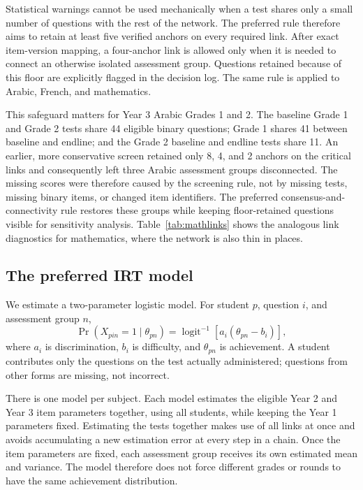 Statistical warnings cannot be used mechanically when a test shares only a
small number of questions with the rest of the network. The preferred rule
therefore aims to retain at least five verified anchors on every required link.
After exact item-version mapping, a four-anchor link is allowed only when it is
needed to connect an otherwise isolated assessment group. Questions retained
because of this floor are explicitly flagged in the decision log. The same
rule is applied to Arabic, French, and mathematics.

This safeguard matters for Year 3 Arabic Grades 1 and 2. The baseline Grade 1
and Grade 2 tests share 44 eligible binary questions; Grade 1 shares 41 between
baseline and endline; and the Grade 2 baseline and endline tests share 11. An
earlier, more conservative screen retained only 8, 4, and 2 anchors on the
critical links and consequently left three Arabic assessment groups
disconnected. The missing scores were therefore caused by the screening rule,
not by missing tests, missing binary items, or changed item identifiers. The
preferred consensus-and-connectivity rule restores these groups while keeping
floor-retained questions visible for sensitivity analysis. Table~\ref{tab:mathlinks}
shows the analogous link diagnostics for mathematics, where the network is
also thin in places.

\subsection{The preferred IRT model}

We estimate a two-parameter logistic model. For student \(p\), question \(i\),
and assessment group \(n\),
\[
 \Pr(X_{pin}=1\mid\theta_{pn})
 =\operatorname{logit}^{-1}\!\left[a_i(\theta_{pn}-b_i)\right],
\]
where \(a_i\) is discrimination, \(b_i\) is difficulty, and
\(\theta_{pn}\) is achievement. A student contributes only the questions on
the test actually administered; questions from other forms are missing, not
incorrect.

There is one model per subject. Each model estimates the eligible Year 2 and
Year 3 item parameters together, using all students, while keeping the Year 1
parameters fixed. Estimating the tests together makes use of all links at once
and avoids accumulating a new estimation error at every step in a chain. Once
the item parameters are fixed, each assessment group receives its own estimated
mean and variance. The model therefore does not force different grades or
rounds to have the same achievement distribution.

